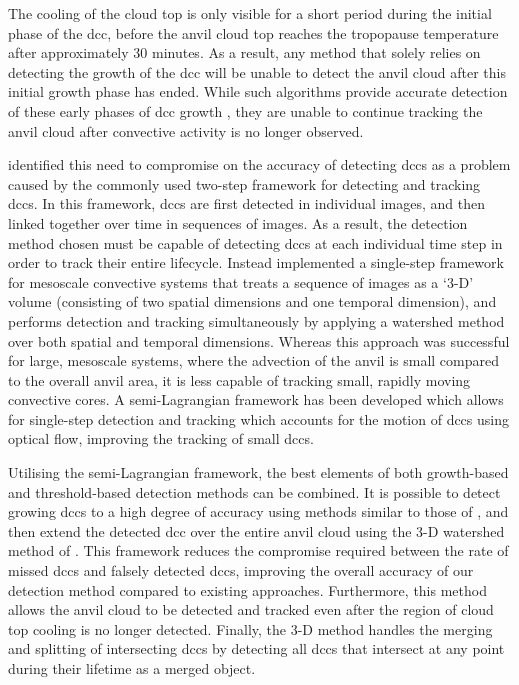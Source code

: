 The cooling of the cloud top is only visible for a short period during the initial phase of the \acrshort{dcc}, before the anvil cloud top reaches the tropopause temperature after approximately 30 minutes.
As a result, any method that solely relies on detecting the growth of the \acrshort{dcc} will be unable to detect the anvil cloud after this initial growth phase has ended.
While such algorithms provide accurate detection of these early phases of \acrshort{dcc} growth \citep{zinner_validation_2013}, they are unable to continue tracking the anvil cloud after convective activity is no longer observed.

\citet{fiolleau_algorithm_2013} identified this need to compromise on the accuracy of detecting \acrshort{dcc}s as a problem caused by the commonly used two-step framework for detecting and tracking \acrshort{dcc}s.
In this framework, \acrshort{dcc}s are first detected in individual images, and then linked together over time in sequences of images.
As a result, the detection method chosen must be capable of detecting \acrshort{dcc}s at each individual time step in order to track their entire lifecycle.
Instead \citet{fiolleau_algorithm_2013} implemented a single-step framework for mesoscale convective systems that treats a sequence of images as a `3-D' volume (consisting of two spatial dimensions and one temporal dimension), and performs detection and tracking simultaneously by applying a watershed method over both spatial and temporal dimensions.
Whereas this approach was successful for large, mesoscale systems, where the advection of the anvil is small compared to the overall anvil area, it is less capable of tracking small, rapidly moving convective cores.
A semi-Lagrangian framework has been developed which allows for single-step detection and tracking which accounts for the motion of \acrshort{dcc}s using optical flow, improving the tracking of small \acrshort{dcc}s.

Utilising the semi-Lagrangian framework, the best elements of both growth-based and threshold-based detection methods can be combined.
It is possible to detect growing \acrshort{dcc}s to a high degree of accuracy using methods similar to those of \citet{zinner_cb-tram_2008}, and then extend the detected \acrshort{dcc} over the entire anvil cloud using the 3-D watershed method of \citet{fiolleau_algorithm_2013}.
This framework reduces the compromise required between the rate of missed \acrshort{dcc}s and falsely detected \acrshort{dcc}s, improving the overall accuracy of our detection method compared to existing approaches.
Furthermore, this method allows the anvil cloud to be detected and tracked even after the region of cloud top cooling is no longer detected.
Finally, the 3-D method handles the merging and splitting of intersecting \acrshort{dcc}s by detecting all \acrshort{dcc}s that intersect at any point during their lifetime as a merged object.


